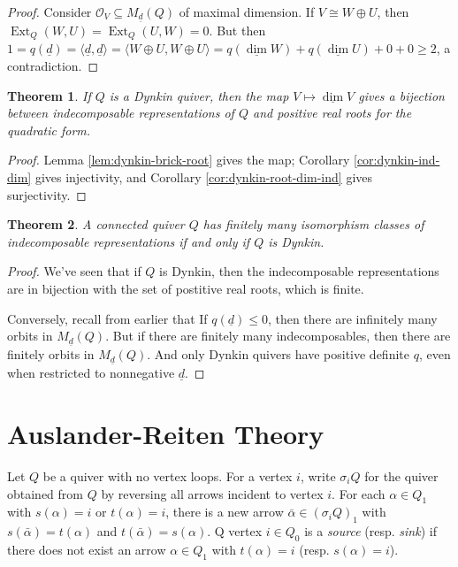 \documentclass{book}
\newtheorem{theorem}{Theorem}[section]
\newcommand{\defterm}{\emph}
\DeclareMathOperator{\Ext}{Ext}
\begin{document}
\begin{proof}
Consider $\mathcal O_V \subseteq M_{\underline d}(Q)$ of maximal dimension. If $V \cong W \oplus U$, then $\Ext_Q(W,U) = \Ext_Q(U,W) = 0$. But then $1 = q(\underline d) = \langle \underline d, \underline d \rangle = \langle W \oplus U, W \oplus U \rangle = q(\underline \dim W) + q(\underline \dim U) + 0 + 0 \geq 2$, a contradiction.
\end{proof} 

\begin{theorem}
If $Q$ is a Dynkin quiver, then the map $V \mapsto \underline \dim V$ gives a bijection between indecomposable representations of $Q$ and positive real roots for the quadratic form.
\end{theorem}

\begin{proof}
Lemma \ref{lem:dynkin-brick-root} gives the map; Corollary \ref{cor:dynkin-ind-dim} gives injectivity, and Corollary \ref{cor:dynkin-root-dim-ind} gives surjectivity.
\end{proof}

\begin{theorem}
A connected quiver $Q$ has finitely many isomorphism classes of indecomposable representations if and only if $Q$ is Dynkin.
\end{theorem}

\begin{proof}
We've seen that if $Q$ is Dynkin, then the indecomposable representations are in bijection with the set of postitive real roots, which is finite.

Conversely, recall from earlier that If $q(\underline d) \leq 0$, then there are infinitely many orbits in $M_{\underline d}(Q)$. But if there are finitely many indecomposables, then there are finitely orbits in $M_{\underline d}(Q)$. And only Dynkin quivers have positive definite $q$, even when restricted to nonnegative $\underline d$.
\end{proof}




  \section{Auslander-Reiten Theory}

Let $Q$ be a quiver with no vertex loops. For a vertex $i$, write $\sigma_i Q$ for the quiver obtained from $Q$ by reversing all arrows incident to vertex $i$. For each $\alpha \in Q_1$ with $s(\alpha) = i$ or $t(\alpha) = i$, there is a new arrow $\bar \alpha \in (\sigma_i Q)_1$ with $s(\bar \alpha) = t(\alpha)$ and $t(\bar \alpha) = s(\alpha)$. Q vertex $i \in Q_0$ is a \defterm{source} (resp. \defterm{sink}) if there does not exist an arrow $\alpha \in Q_1$ with $t(\alpha) = i$ (resp. $s(\alpha) = i$).
\end{document}
